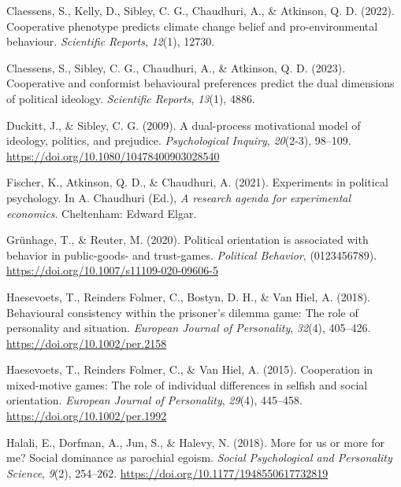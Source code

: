 \documentclass[
  man,floatsintext]{apa6}
\newlength{\cslhangindent}
\newlength{\cslentryspacingunit} %
\newenvironment{CSLReferences}[2] %
 {%
  \setlength{\parindent}{0pt}
  \ifodd #1
  \let\oldpar\par
  \def\par{\hangindent=\cslhangindent\oldpar}
  \fi
  \setlength{\parskip}{#2\cslentryspacingunit}
 }%
 {}
\begin{document}
\begin{CSLReferences}{1}{0}
\leavevmode{}%
Claessens, S., Kelly, D., Sibley, C. G., Chaudhuri, A., \& Atkinson, Q. D. (2022). Cooperative phenotype predicts climate change belief and pro-environmental behaviour. \emph{Scientific Reports}, \emph{12}(1), 12730.

\leavevmode{}%
Claessens, S., Sibley, C. G., Chaudhuri, A., \& Atkinson, Q. D. (2023). Cooperative and conformist behavioural preferences predict the dual dimensions of political ideology. \emph{Scientific Reports}, \emph{13}(1), 4886.

\leavevmode{}%
Duckitt, J., \& Sibley, C. G. (2009). A dual-process motivational model of ideology, politics, and prejudice. \emph{Psychological Inquiry}, \emph{20}(2-3), 98--109. \url{https://doi.org/10.1080/10478400903028540}

\leavevmode{}%
Fischer, K., Atkinson, Q. D., \& Chaudhuri, A. (2021). Experiments in political psychology. In A. Chaudhuri (Ed.), \emph{A research agenda for experimental economics}. Cheltenham: Edward Elgar.

\leavevmode{}%
Grünhage, T., \& Reuter, M. (2020). Political orientation is associated with behavior in public-goods- and trust-games. \emph{Political Behavior}, (0123456789). \url{https://doi.org/10.1007/s11109-020-09606-5}

\leavevmode{}%
Haesevoets, T., Reinders Folmer, C., Bostyn, D. H., \& Van Hiel, A. (2018). Behavioural consistency within the prisoner's dilemma game: The role of personality and situation. \emph{European Journal of Personality}, \emph{32}(4), 405--426. \url{https://doi.org/10.1002/per.2158}

\leavevmode{}%
Haesevoets, T., Reinders Folmer, C., \& Van Hiel, A. (2015). Cooperation in mixed-motive games: The role of individual differences in selfish and social orientation. \emph{European Journal of Personality}, \emph{29}(4), 445--458. \url{https://doi.org/10.1002/per.1992}

\leavevmode{}%
Halali, E., Dorfman, A., Jun, S., \& Halevy, N. (2018). More for us or more for me? Social dominance as parochial egoism. \emph{Social Psychological and Personality Science}, \emph{9}(2), 254--262. \url{https://doi.org/10.1177/1948550617732819}


\end{CSLReferences}
\end{document}
